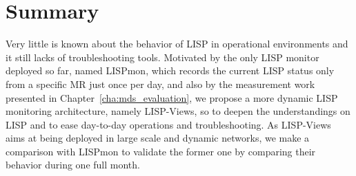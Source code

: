 \section{Summary}
\label{sec:lispviews_conclusion}

Very little is known about the behavior of LISP in operational environments and it still lacks of troubleshooting tools. Motivated by the only LISP monitor deployed so far, named LISPmon, which records the current LISP status only from a specific MR just once per day, and also by the measurement work presented in Chapter~\ref{cha:mds_evaluation}, we propose a more dynamic LISP monitoring architecture, namely LISP-Views, so to deepen the understandings on LISP and to ease day-to-day operations and troubleshooting. As LISP-Views aims at being deployed in large scale and dynamic networks, we make a comparison with LISPmon to validate the former one by comparing their behavior during one full month.

